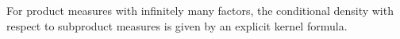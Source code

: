 For product measures with infinitely many factors, the conditional density with respect to subproduct measures is given by an explicit kernel formula.
